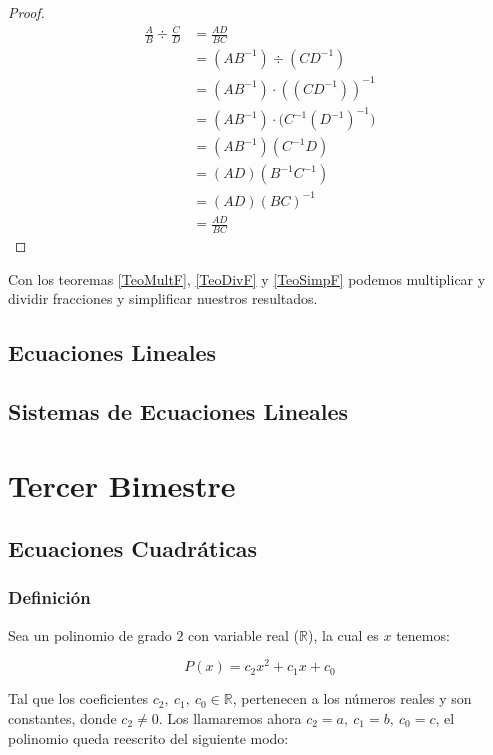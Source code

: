 \documentclass[A4paper, 10pt, oneside]{book}
\begin{document}
	\begin{proof}
		\begin{align*}
			\frac{A}{B}\div \frac{C}{D} &= \frac{AD}{BC}\\
			&=(AB^{-1})\div(CD^{-1})\\
			&=(AB^{-1})\cdot \left((CD^{-1})\right)^{-1}\\
			&=(AB^{-1})\cdot \big(C^{-1}(D^{-1})^{-1}\big)\\
			&=(AB^{-1})(C^{-1}D)\\
			&=(AD)(B^{-1}C^{-1})\\
			&=(AD)(BC)^{-1}\\
			&=\frac{AD}{BC}
		\end{align*}
	\end{proof}

	Con los teoremas \ref{TeoMultF}, \ref{TeoDivF} y \ref{TeoSimpF} podemos multiplicar y dividir fracciones y simplificar nuestros resultados.
	
	\chapter{Ecuaciones Lineales}
	
	\chapter{Sistemas de Ecuaciones Lineales}
	\part{Tercer Bimestre}
	\chapter{Ecuaciones Cuadráticas}
	\section{Definición}
	Sea un polinomio de grado $2$ con variable real ($\displaystyle{\mathbb{R}}$), la cual es $x$ tenemos: 
	
	$$P(x)=c_2x^2+c_1x+c_0$$
	
	Tal que los coeficientes $\displaystyle{c_2, \ c_1, \ c_0 \in \mathbb{R}}$, pertenecen a los números reales y son constantes, donde $c_2 \neq 0$. Los llamaremos ahora $c_2 = a, \ c_1 = b, \ c_0 = c$, el polinomio queda reescrito del siguiente modo:
	
\end{document}
